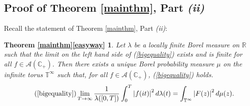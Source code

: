\documentclass[]{elsarticle}
\newcommand{\R}{\mathbb{R}}
\newcommand{\T}{\mathbb{T}}
\newcommand{\cA}{\mathcal{A}}
\newcommand{\cplus}{\mathbb{C}_{+}}
\numberwithin{equation}{section}
\newtheorem*{mythmb}{Theorem \ref{mainthm}\ref{easyway}}
\begin{document}
\subsection{Proof of Theorem \ref{mainthm}, Part \textit{(ii)}} %
  \label{secconverse}
    Recall the statement of Theorem \ref{mainthm}, Part \textit{(ii)}:
    \begin{mythmb} 
        Let $\lambda$ be a locally finite Borel measure on $\R$ such that the limit on the left hand side of (\ref{bigequality}) exists and is finite for all $f \in \cA(\cplus)$. Then there exists a unique Borel probability measure $\mu$ on the infinite torus \(\T^{\infty}\) such that, for all $f \in \cA(\cplus)$, (\ref{bigequality}) holds.
        \begin{equation} \tag{\ref{bigequality}}
          \lim_{T \to \infty} \frac{1}{\lambda([0,T])} \int_{0}^{T}\left|f(it)\right|^2 d\lambda(t)
          = \int_{\T^{\infty}} \left| F(z)\right|^2 d\mu(z).
        \end{equation} 
      \end{mythmb}
\end{document}
